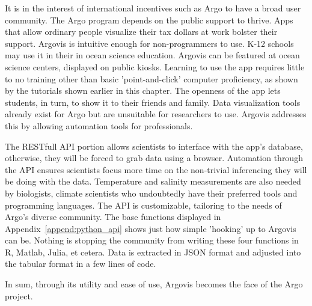 It is in the interest of international incentives such as Argo to have a broad user community. The Argo program depends on the public support to thrive. Apps that allow ordinary people visualize their tax dollars at work bolster their support. Argovis is intuitive enough for non-programmers to use. K-12 schools may use it in their in ocean science education. Argovis can be featured at ocean science centers, displayed on public kiosks. Learning to use the app requires little to no training other than basic 'point-and-click' computer proficiency, as shown by the tutorials shown earlier in this chapter. The openness of the app lets students, in turn, to show it to their friends and family. Data visualization tools already exist for Argo but are unsuitable for researchers to use. Argovis addresses this by allowing automation tools for professionals.

The RESTfull API portion allows scientists to interface with the app's database, otherwise, they will be forced to grab data using a browser. Automation through the API ensures scientists focus more time on the non-trivial inferencing they will be doing with the data. Temperature and salinity measurements are also needed by biologists, climate scientists who undoubtedly have their preferred tools and programming languages. The API is customizable, tailoring to the needs of Argo's diverse community. The base functions displayed in Appendix~\ref{append:python_api} shows just how simple 'hooking' up to Argovis can be. Nothing is stopping the community from writing these four functions in R, Matlab, Julia, et cetera. Data is extracted in JSON format and adjusted into the tabular format in a few lines of code.

In sum, through its utility and ease of use, Argovis becomes the face of the Argo project. 